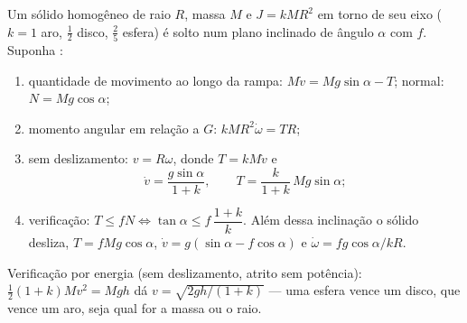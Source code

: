 \begin{method}\label{met:b2:rigid-body-mechanics:incline}
Um sólido homogêneo de raio $R$, massa $M$ e  $J =
kMR^2$ em torno de seu eixo ($k = 1$ aro, $\tfrac12$ disco, $\tfrac25$ esfera)
é solto num plano inclinado de ângulo $\alpha$ com 
$f$. Suponha :
\begin{enumerate}
  \item quantidade de movimento ao longo da rampa: $M\dot v = Mg\sin\alpha - T$; normal:
        $N = Mg\cos\alpha$;
  \item momento angular em relação a $G$: $kMR^2\dot\omega = TR$;
  \item sem deslizamento: $v = R\omega$, donde $T = kM\dot v$ e
        \[
        \dot v = \frac{g\sin\alpha}{1 + k} , \qquad T = \frac{k}{1 + k}\,
        Mg\sin\alpha ;
        \]
  \item verificação: $T \le fN \iff \tan\alpha \le f\,\dfrac{1 + k}{k}$.
        Além dessa inclinação o sólido desliza, $T = fMg\cos\alpha$, $\dot v =
        g(\sin\alpha - f\cos\alpha)$ e $\dot\omega = fg\cos\alpha/kR$.
\end{enumerate}
Verificação por energia (sem deslizamento, atrito sem potência): $\tfrac12(1 + k)Mv^2 =
Mgh$ dá $v = \sqrt{2gh/(1 + k)}$ --- uma esfera vence um disco, que
vence um aro, seja qual for a massa ou o raio.
\end{method}

